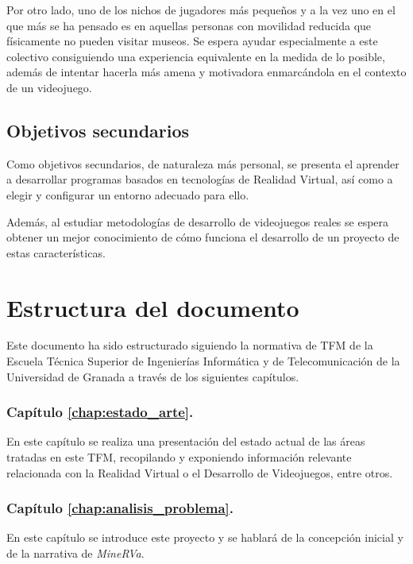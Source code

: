 Por otro lado, uno de los nichos de jugadores más pequeños y a la vez uno en el que más se ha pensado es en aquellas personas con movilidad reducida que físicamente no pueden visitar museos. Se espera ayudar especialmente a este colectivo consiguiendo una experiencia equivalente en la medida de lo posible, además de intentar hacerla más amena y motivadora enmarcándola en el contexto de un videojuego.

\subsection{Objetivos secundarios}

Como objetivos secundarios, de naturaleza más personal, se presenta el aprender a desarrollar programas basados en tecnologías de Realidad Virtual, así como a elegir y configurar un entorno adecuado para ello.

Además, al estudiar metodologías de desarrollo de videojuegos reales se espera obtener un mejor conocimiento de cómo funciona el desarrollo de un proyecto de estas características.

\section{Estructura del documento}

Este documento ha sido estructurado siguiendo la normativa de \acs{TFM} de la Escuela Técnica Superior de Ingenierías Informática y de Telecomunicación de la Universidad de Granada a través de los siguientes capítulos.

\subsubsection{Capítulo \ref{chap:estado_arte}. }

En este capítulo se realiza una presentación del estado actual de las áreas tratadas en este \acs{TFM}, recopilando y exponiendo información relevante relacionada con la Realidad Virtual o el Desarrollo de Videojuegos, entre otros.

\subsubsection{Capítulo \ref{chap:analisis_problema}. }

En este capítulo se introduce este proyecto y se hablará de la concepción inicial y de la narrativa de \textit{MineRVa}.

